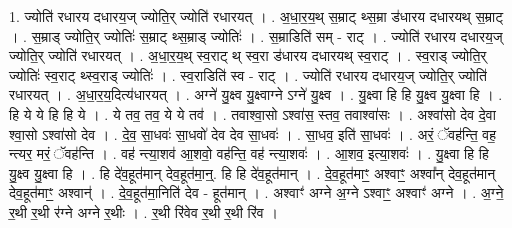 \documentclass[17pt]{extarticle}
\begin{document}
1. ज्योति॑ रधारय दधारय॒ज् ज्योति॒र् ज्योति॑ रधारयत् । . अ॒धा॒र॒य॒थ् स॒म्राट् थ्स॒म्रा ड॑धारय दधारयथ् स॒म्राट् । . स॒म्राड् ज्योति॒र् ज्योतिः॑ स॒म्राट् थ्स॒म्राड् ज्योतिः॑ । . स॒म्राडिति॑ सम् - राट् । . ज्योति॑ रधारय दधारय॒ज् ज्योति॒र् ज्योति॑ रधारयत् । . अ॒धा॒र॒य॒थ् स्व॒राट् थ् स्व॒रा ड॑धारय दधारयथ् स्व॒राट् । . स्व॒राड् ज्योति॒र् ज्योतिः॑ स्व॒राट् थ्स्व॒राड् ज्योतिः॑ । . स्व॒राडिति॑ स्व - राट् । . ज्योति॑ रधारय दधारय॒ज् ज्योति॒र् ज्योति॑ रधारयत् । . अ॒धा॒र॒य॒दित्य॑धारयत् । . अग्ने॑ यु॒क्ष्व यु॒क्ष्वाग्ने ऽग्ने॑ यु॒क्ष्व । . यु॒क्ष्वा हि हि यु॒क्ष्व यु॒क्ष्वा हि । . हि ये ये हि हि ये । . ये तव॒ तव॒ ये ये तव॑ । . तवाश्वा॒सो ऽश्वा॑स॒ स्तव॒ तवाश्वा॑सः । . अश्वा॑सो देव दे॒वा श्वा॒सो ऽश्वा॑सो देव । . दे॒व॒ सा॒धवः॑ सा॒धवो॑ देव देव सा॒धवः॑ । . सा॒धव॒ इति॑ सा॒धवः॑ । . अरं॒ ॅवह॑न्ति॒ वह॒ न्त्यर॒ मरं॒ ॅवह॑न्ति । . वह॑ न्त्या॒शव॑ आ॒शवो॒ वह॑न्ति॒ वह॑ न्त्या॒शवः॑ । . आ॒शव॒ इत्या॒शवः॑ । . यु॒क्ष्वा हि हि यु॒क्ष्व यु॒क्ष्वा हि । . हि दे॑व॒हूत॑मान् देव॒हूत॑मा॒न्॒. हि हि दे॑व॒हूत॑मान् । . दे॒व॒हूत॑माꣳ॒॒ अश्वाꣳ॒॒ अश्वा᳚न् देव॒हूत॑मान् देव॒हूत॑माꣳ॒॒ अश्वान्॑ । . दे॒व॒हूत॑मा॒निति॑ देव - हूत॑मान् । . अश्वाꣳ॑ अग्ने अ॒ग्ने ऽश्वाꣳ॒॒ अश्वाꣳ॑ अग्ने । . अ॒ग्ने॒ र॒थी र॒थी र॑ग्ने अग्ने र॒थीः । . र॒थी रि॑वेव र॒थी र॒थी रि॑व । \newline
\end{document}
